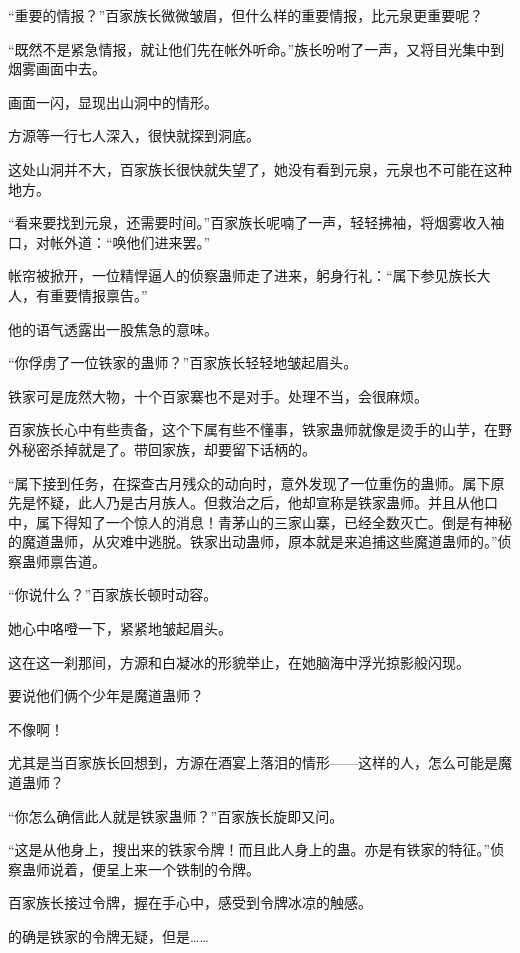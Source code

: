 
\begin{this_body}

“重要的情报？”百家族长微微皱眉，但什么样的重要情报，比元泉更重要呢？

“既然不是紧急情报，就让他们先在帐外听命。”族长吩咐了一声，又将目光集中到烟雾画面中去。

画面一闪，显现出山洞中的情形。

方源等一行七人深入，很快就探到洞底。

这处山洞并不大，百家族长很快就失望了，她没有看到元泉，元泉也不可能在这种地方。

“看来要找到元泉，还需要时间。”百家族长呢喃了一声，轻轻拂袖，将烟雾收入袖口，对帐外道：“唤他们进来罢。”

帐帘被掀开，一位精悍逼人的侦察蛊师走了进来，躬身行礼：“属下参见族长大人，有重要情报禀告。”

他的语气透露出一股焦急的意味。

“你俘虏了一位铁家的蛊师？”百家族长轻轻地皱起眉头。

铁家可是庞然大物，十个百家寨也不是对手。处理不当，会很麻烦。

百家族长心中有些责备，这个下属有些不懂事，铁家蛊师就像是烫手的山芋，在野外秘密杀掉就是了。带回家族，却要留下话柄的。

“属下接到任务，在探查古月残众的动向时，意外发现了一位重伤的蛊师。属下原先是怀疑，此人乃是古月族人。但救治之后，他却宣称是铁家蛊师。并且从他口中，属下得知了一个惊人的消息！青茅山的三家山寨，已经全数灭亡。倒是有神秘的魔道蛊师，从灾难中逃脱。铁家出动蛊师，原本就是来追捕这些魔道蛊师的。”侦察蛊师禀告道。

“你说什么？”百家族长顿时动容。

她心中咯噔一下，紧紧地皱起眉头。

这在这一刹那间，方源和白凝冰的形貌举止，在她脑海中浮光掠影般闪现。

要说他们俩个少年是魔道蛊师？

不像啊！

尤其是当百家族长回想到，方源在酒宴上落泪的情形——这样的人，怎么可能是魔道蛊师？

“你怎么确信此人就是铁家蛊师？”百家族长旋即又问。

“这是从他身上，搜出来的铁家令牌！而且此人身上的蛊。亦是有铁家的特征。”侦察蛊师说着，便呈上来一个铁制的令牌。

百家族长接过令牌，握在手心中，感受到令牌冰凉的触感。

的确是铁家的令牌无疑，但是……


\end{this_body}
